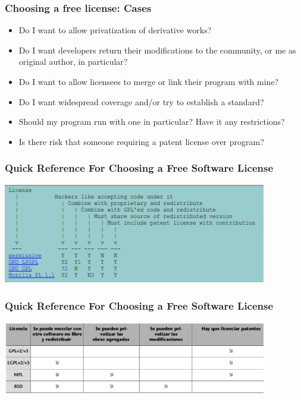 
\begin{frame}
\frametitle{Choosing a free license: Cases}

\begin{itemize}
\item Do I want to allow privatization of derivative works?
\item Do I want developers return their modifications to the community, or me as original author, in particular?
\item Do I want to allow licensees to merge or link their program with mine?
\item Do I want widespread coverage and/or try to establish a standard?
\item Should my program run with one in particular? Have it any restrictions?
\item Is there risk that someone requiring a patent license over program?
\end{itemize}


\end{frame}


\begin{frame}
\frametitle{Quick Reference For Choosing a Free Software License}

\begin{center}
\includegraphics[width=11.5cm]{figs/licenses_quick_reference.png}
\end{center}

\end{frame}


\begin{frame}
\frametitle{Quick Reference For Choosing a Free Software License}

\begin{center}
\includegraphics[width=11.5cm]{figs/tabla_licencias.png}
\end{center}

\end{frame}

